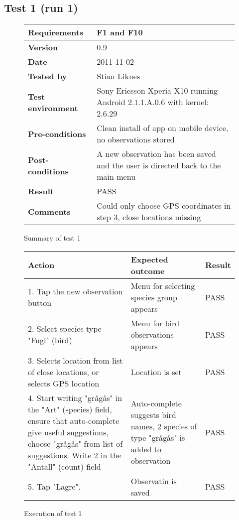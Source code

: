 \newpage
\subsection*{Test 1 (run 1)}

	\begin{figure}[htb]
		\centering
		\begin{tabular}{|p{3.5cm}|p{7.0cm}|} \hline
			\textbf{Requirements} & F1 and F10 \\ \hline
			\textbf{Version} & 0.9 \\ \hline
			\textbf{Date} & 2011-11-02 \\ \hline
			\textbf{Tested by} & Stian Liknes \\ \hline
			\textbf{Test environment} & Sony Ericsson Xperia X10 running Android 2.1.1.A.0.6 with kernel: 2.6.29 \\ \hline
			\textbf{Pre-conditions} & Clean install of app on mobile device, no observations stored \\ \hline
			\textbf{Post-conditions} & A new observation has been saved and the user is directed back to the main menu \\ \hline
			\textbf{Result} & PASS \\ \hline
			\textbf{Comments} & Could only choose GPS coordinates in step 3, close locations missing \\ \hline
		\end{tabular}
		\caption{Summary of test 1}
	\end{figure}

	\begin{figure}[htb]
		\centering
		\begin{tabular}{|p{5.0cm}|p{5.0cm}|p{1cm}|}
			\hline \textbf{Action} & \textbf{Expected outcome} & \textbf{Result} \\ \hline
			1. Tap the new observation button & Menu for selecting species group appears & PASS \\ \hline
			2. Select species type "Fugl" (bird) & Menu for bird observations appears & PASS \\ \hline
			3. Selects location from list of close locations, or selects GPS location & Location is set & PASS \\ \hline
			4. Start writing "grågås" in the "Art" (species) field, ensure that
			auto-complete give useful suggestions, choose "grågås" from list of
			suggestions. Write 2 in the "Antall" (count) field & Auto-complete
			suggests bird names, 2 species of type "grågås" is added to observation
			& PASS \\ \hline 
			5. Tap "Lagre". & Observatin is saved & PASS \\ \hline
		\end{tabular}
		\caption{Execution of test 1}
	\end{figure}

